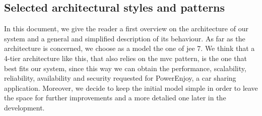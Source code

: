 \subsection{Selected architectural styles and patterns} \label{arch-styles}

In this document, we give the reader a first overview on the architecture of our system and a general and simplified description of its behaviour.
As far as the architecture is concerned, we choose as a model the one of \acl{jee} 7. We think that a 4-tier architecture like this, that also relies on the \acs{mvc} pattern, is the one that best fits our system, since this way we can obtain the performance, scalability, reliability, availability and security requested for PowerEnjoy, a car sharing application.
Moreover, we decide to keep the initial model simple in order to leave the space for further improvements and a more detalied one later in the development.

